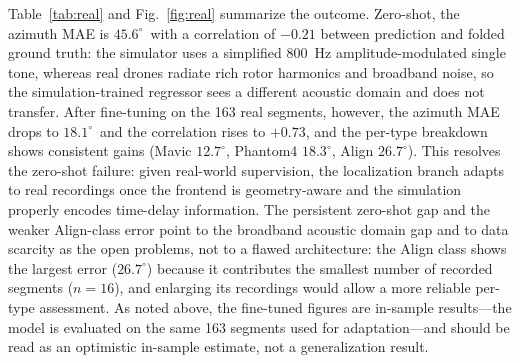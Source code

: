 \documentclass[sensors,article,submit,pdftex,moreauthors]{Definitions/mdpi}
\begin{document}
Table~\ref{tab:real} and Fig.~\ref{fig:real} summarize the outcome. Zero-shot, the azimuth MAE is $45.6^\circ$\, with a correlation of $-0.21$ between prediction and folded ground truth: the simulator uses a simplified \SI{800}{\hertz} amplitude-modulated single tone, whereas real drones radiate rich rotor harmonics and broadband noise, so the simulation-trained regressor sees a different acoustic domain and does not transfer. After fine-tuning on the 163 real segments, however, the azimuth MAE drops to $\mathbf{18.1^\circ}$\, and the correlation rises to $\mathbf{+0.73}$, and the per-type breakdown shows consistent gains (Mavic $12.7^\circ$, Phantom4 $18.3^\circ$, Align $26.7^\circ$). This resolves the zero-shot failure: given real-world supervision, the localization branch adapts to real recordings once the frontend is geometry-aware and the simulation properly encodes time-delay information. The persistent zero-shot gap and the weaker Align-class error point to the broadband acoustic domain gap and to data scarcity as the open problems, not to a flawed architecture: the Align class shows the largest error ($26.7^\circ$) because it contributes the smallest number of recorded segments ($n=16$), and enlarging its recordings would allow a more reliable per-type assessment. As noted above, the fine-tuned figures are in-sample results---the model is evaluated on the same 163 segments used for adaptation---and should be read as an optimistic in-sample estimate, not a generalization result.
\end{document}
